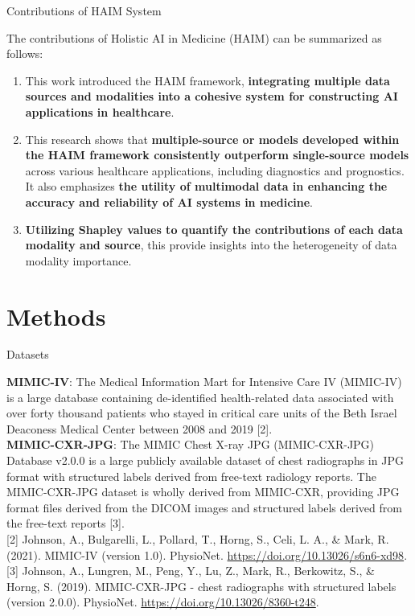 \documentclass{sintefbeamer}
\theoremstyle{definition}
\begin{document}
\begin{frame}{Contributions of HAIM System}

\small

The contributions of Holistic AI in Medicine (HAIM) can be summarized as follows:

\begin{enumerate}
    \item This work introduced the HAIM framework, \textbf{integrating multiple data sources and modalities into a cohesive system for constructing AI applications in healthcare}.     
    \item This research shows that \textbf{multiple-source or models developed within the HAIM framework consistently outperform single-source models} across various healthcare applications, including diagnostics and prognostics. It also emphasizes \textbf{the utility of multimodal data in enhancing the accuracy and reliability of AI systems in medicine}.    
    \item \textbf{Utilizing Shapley values to quantify the contributions of each data modality and source}, this provide insights into the heterogeneity of data modality importance. 
\end{enumerate}


\end{frame}

\section{Methods}

\begin{frame}{Datasets}

\footnotesize \textbf{MIMIC-IV}: The Medical Information Mart for Intensive Care IV (MIMIC-IV) is a large database containing de-identified health-related data associated with over forty thousand patients who stayed in critical care units of the Beth Israel Deaconess Medical Center between 2008 and 2019 [2].\\[0.2cm]

\footnotesize \textbf{MIMIC-CXR-JPG}: The MIMIC Chest X-ray JPG (MIMIC-CXR-JPG) Database v2.0.0 is a large publicly available dataset of chest radiographs in JPG format with structured labels derived from free-text radiology reports. The MIMIC-CXR-JPG dataset is wholly derived from MIMIC-CXR, providing JPG format files derived from the DICOM images and structured labels derived from the free-text reports [3].\\[0.5cm]

\tiny [2] Johnson, A., Bulgarelli, L., Pollard, T., Horng, S., Celi, L. A., \& Mark, R. (2021). MIMIC-IV (version 1.0). PhysioNet. \url{https://doi.org/10.13026/s6n6-xd98}.\\[0.1cm]

\tiny [3] Johnson, A., Lungren, M., Peng, Y., Lu, Z., Mark, R., Berkowitz, S., \& Horng, S. (2019). MIMIC-CXR-JPG - chest radiographs with structured labels (version 2.0.0). PhysioNet. \url{https://doi.org/10.13026/8360-t248}.

\end{frame}
\end{document}
